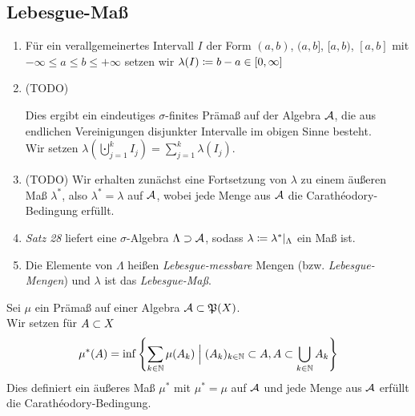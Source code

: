 \documentclass[skript.tex]{subfiles}
\begin{document}
	
	\subsection*{Lebesgue-Maß}
		\begin{enumerate}[(1)]
			\item Für ein verallgemeinertes Intervall $I$ der Form
			$(a,b)$, $(a,b]$, $[a,b)$, $[a,b]$ mit \\ $-\infty \leq a \leq b \leq +\infty$ setzen wir
			$\lambda(I) \coloneqq b-a \in [0,\infty]$
			\item (TODO)
				\begin{lem}
					\unskip
					Dies ergibt ein eindeutiges $\sigma$-finites Prämaß auf der Algebra $\mathcal{A}$,
					die aus endlichen Vereinigungen disjunkter Intervalle im obigen Sinne besteht. \\
					Wir setzen
					$\lambda{\left(\bigcupdot_{j=1}^k I_j \right)} = \sum_{j=1}^k \lambda(I_j)$.
				\end{lem}
			\item (TODO) Wir erhalten zunächst eine Fortsetzung von $\lambda$ zu einem äußeren Maß
				$\lambda^*$, also $\lambda^*=\lambda$ auf $\mathcal{A}$, wobei jede Menge aus
				$\mathcal{A}$ die Carathéodory-Bedingung erfüllt.
			\item \emph{Satz 28} liefert eine $\sigma$-Algebra $\Lambda\supset\mathcal{A}$, sodass 
				$\lambda \coloneqq \lambda^*{\mid_\Lambda}$ ein Maß ist.
			\item
				\begin{defin}
					\unskip
					Die Elemente von $\Lambda$ heißen \textit{Lebesgue-messbare} Mengen (bzw.
					\textit{Lebesgue-Mengen}) und $\lambda$ ist das \textit{Lebesgue-Maß}.
				\end{defin}
		\end{enumerate}
		
		\addtocounter{cntr}{-3} %
		\begin{lem}[Ad 3]
			Sei $\mu$ ein Prämaß auf einer Algebra $\mathcal{A} \subset \mathfrak{P}(X)$. \\
			Wir setzen für $A \subset X$
			\[
				\mu^*(A) = \inf\left\{ 
				  \sum_{k\in\mathbb{N}} \mu(A_k)
				  \Bigm\vert (A_k)_{k\in\mathbb{N}} \subset A, A \subset \bigcup_{k\in\mathbb{N}} A_k
				\right\}
			\]
			Dies definiert ein äußeres Maß $\mu^*$ mit $\mu^* = \mu$ auf $\mathcal{A}$
			und jede Menge aus $\mathcal{A}$ erfüllt die Carathéodory-Bedingung. %
		\end{lem}
		\addtocounter{cntr}{2} %
		
\end{document}
